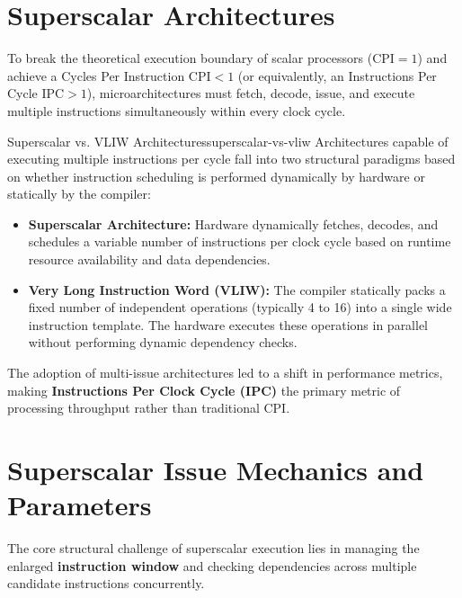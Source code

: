 \section{Superscalar Architectures}
\label{sec:superscalar_architectures}

To break the theoretical execution boundary of scalar processors ($\text{CPI} = 1$) and achieve a Cycles Per Instruction $\text{CPI} < 1$ (or equivalently, an Instructions Per Cycle $\text{IPC} > 1$), microarchitectures must fetch, decode, issue, and execute multiple instructions simultaneously within every clock cycle.

\begin{definition}{Superscalar vs. VLIW Architectures}{superscalar-vs-vliw}
Architectures capable of executing multiple instructions per cycle fall into two structural paradigms based on whether instruction scheduling is performed dynamically by hardware or statically by the compiler:
\begin{itemize}
    \item \textbf{Superscalar Architecture:} Hardware dynamically fetches, decodes, and schedules a variable number of instructions per clock cycle based on runtime resource availability and data dependencies.
    \item \textbf{Very Long Instruction Word (VLIW):} The compiler statically packs a fixed number of independent operations (typically 4 to 16) into a single wide instruction template. The hardware executes these operations in parallel without performing dynamic dependency checks.
\end{itemize}
\end{definition}

The adoption of multi-issue architectures led to a shift in performance metrics, making \textbf{Instructions Per Clock Cycle (IPC)} the primary metric of processing throughput rather than traditional CPI.

\section{Superscalar Issue Mechanics and Parameters}
\label{sec:superscalar_issue_mechanics}

The core structural challenge of superscalar execution lies in managing the enlarged \textbf{instruction window} and checking dependencies across multiple candidate instructions concurrently.

